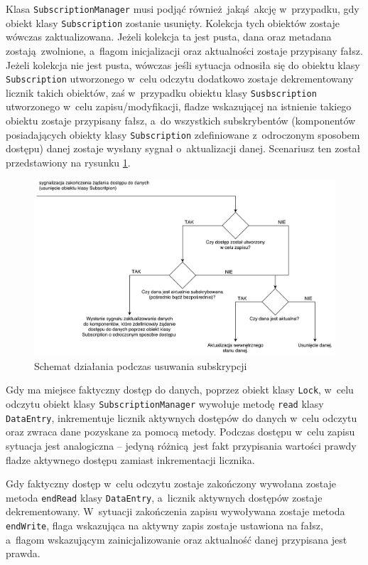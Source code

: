 Klasa \lstinline$SubscriptionManager$ musi podjąć również jakąś akcję w~przypadku, gdy obiekt klasy \lstinline$Subscription$ zostanie usunięty. Kolekcja tych obiektów zostaje wówczas zaktualizowana. Jeżeli kolekcja ta jest pusta, dana oraz metadana zostają zwolnione, a~flagom inicjalizacji oraz aktualności zostaje przypisany fałsz.
Jeżeli kolekcja nie jest pusta, wówczas jeśli sytuacja odnosiła się do obiektu klasy \lstinline$Subscription$ utworzonego w~celu odczytu dodatkowo zostaje dekrementowany licznik takich obiektów, zaś w~przypadku obiektu klasy \lstinline$Susbscription$ utworzonego w~celu zapisu/modyfikacji, fladze wskazującej na istnienie takiego obiektu zostaje przypisany fałsz, a~do wszystkich subskrybentów (komponentów posiadających obiekty klasy \lstinline$Subscription$ zdefiniowane z~odroczonym sposobem dostępu) danej zostaje wysłany sygnał o~aktualizacji danej. Scenariusz ten został przedstawiony na rysunku \ref{fig:unsubscribe}.

\begin{figure}[ht]
	\centering
	\includegraphics[width=1\linewidth]{rys05/unsubscribe}
	\caption{Schemat działania podczas usuwania subskrypcji}
	\label{fig:unsubscribe}	
\end{figure}

Gdy ma miejsce faktyczny dostęp do danych, poprzez obiekt klasy \lstinline$Lock$, w~celu odczytu obiekt klasy \lstinline$SubscriptionManager$ wywołuje metodę \lstinline$read$ klasy \lstinline$DataEntry$, inkrementuje licznik aktywnych dostępów do danych w~celu odczytu oraz zwraca dane pozyskane za pomocą metody. Podczas dostępu w~celu zapisu sytuacja jest analogiczna -- jedyną różnicą jest fakt przypisania wartości prawdy fladze aktywnego dostępu zamiast inkrementacji licznika. 

Gdy faktyczny dostęp w~celu odczytu zostaje zakończony wywołana zostaje metoda \lstinline$endRead$ klasy \lstinline$DataEntry$, a~licznik aktywnych dostępów zostaje dekrementowany. W~sytuacji zakończenia zapisu wywoływana zostaje metoda \lstinline$endWrite$, flaga wskazująca na aktywny zapis zostaje ustawiona na fałsz, a~flagom wskazującym zainicjalizowanie oraz aktualność danej przypisana jest prawda.

